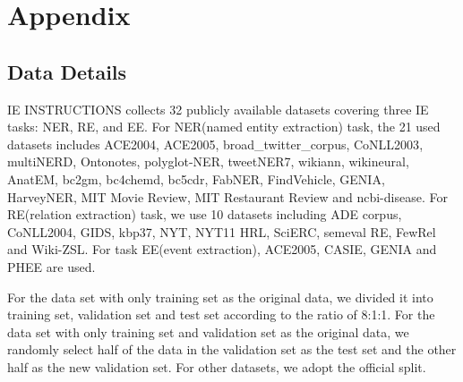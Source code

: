 \documentclass[11pt]{article}
\begin{document}




\section{Appendix}
\label{sec:appendix}
\subsection{Data Details}
\label{data details}
IE INSTRUCTIONS collects 32 publicly available datasets covering three IE tasks: NER, RE, and EE.
For NER(named entity extraction) task, the 21 used datasets includes ACE2004, ACE2005\cite{ACE2005DATASET}, broad\_twitter\_corpus\cite{broad_twitter_corpusDATASET}, CoNLL2003\cite{CoNLL03Dataset}, multiNERD\cite{multiNERDDATASET}, Ontonotes\cite{OntoNotesDataset}, polyglot-NER\cite{polyglot-NERDATASET}, tweetNER7\cite{tweetNER7DATASET}, wikiann\cite{wikiannDataset}, wikineural\cite{wikineuralDATASET}, AnatEM\cite{AnatEM}, bc2gm\cite{Kocaman2020BiomedicalNE}, bc4chemd\cite{bc4chemdDATASET}, bc5cdr\cite{Li2016BioCreativeVC}, FabNER\cite{Kumar2021FabNERIE}, FindVehicle\cite{FindVehicle}, GENIA\cite{GENIANERDATASET}, HarveyNER\cite{HarveyNERDATASET}, MIT Movie Review\cite{MITReviewDataset}, MIT Restaurant Review\cite{MITReviewDataset} and ncbi-disease\cite{ncbi-diseaseDATASET}. For RE(relation extraction) task, we use 10 datasets including ADE corpus\cite{ADEcorpusDATASET}, CoNLL2004\cite{Roth2004ALP}, GIDS\cite{Jat2018ImprovingDS}, kbp37\cite{kbp37DATASET}, NYT\cite{Riedel2010ModelingRA}, NYT11 HRL\cite{Takanobu2018AHF}, SciERC\cite{SciERCDATASET}, semeval RE\cite{Hendrickx2010SemEval2010T8}, FewRel\cite{FewRelDATASET} and Wiki-ZSL\cite{Wiki-ZSLDATASET}. For task EE(event extraction), ACE2005\cite{ACE2005DATASET}, CASIE\cite{Lu2021Text2EventCS}, GENIA\cite{Kim2003GENIAC} and PHEE\cite{Sun2022PHEEAD} are used. 

For the data set with only training set as the original data, we divided it into training set, validation set and test set according to the ratio of 8:1:1. For the data set with only training set and validation set as the original data, we randomly select half of the data in the validation set as the test set and the other half as the new validation set. For other datasets, we adopt the official split.
\end{document}
